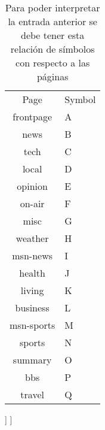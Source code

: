\begin{table}[]
	\centering
	\caption{Para poder interpretar la entrada anterior se debe tener esta relación de símbolos con respecto a las páginas}
	\label{my-label}
	\begin{tabular}{cl}
		Page       & Symbol \\ \cline{1-2}
		frontpage  & A      \\
		news       & B      \\
		tech       & C      \\
		local      & D      \\
		opinion    & E      \\
		on-air     & F      \\
		misc       & G      \\
		weather    & H      \\
		msn-news   & I      \\
		health     & J      \\
		living     & K      \\
		business   & L      \\
		msn-sports & M      \\
		sports     & N      \\
		summary    & O      \\
		bbs        & P      \\
		travel     & Q      \\ 
	\end{tabular}
\end{table}




\begin{forest} 
	[VP
	[DP]
	[V’
	[V]
	[DP]
	]
	]
\end{forest}





